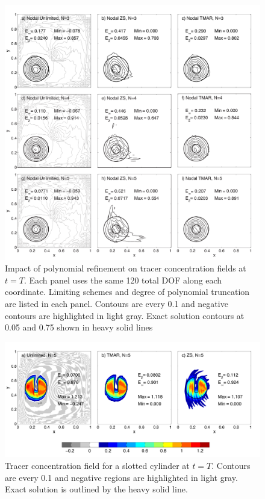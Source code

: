 \documentclass{ametsoc}
\begin{document}
\begin{figure}[t]
\includegraphics[width=\textwidth]{figs/2d/_defCosbell_9pan_pref.pdf}
\caption{Impact of polynomial refinement on tracer concentration fields at $t=T$. Each panel uses the same 120 total DOF along each coordinate. Limiting schemes and degree of polynomial truncation are listed in each panel. Contours are every 0.1 and negative contours are highlighted in light gray. Exact solution contours at 0.05 and 0.75 shown in heavy solid lines}\label{fig:2dCosbellPref}
\end{figure}

\begin{figure}[t]
\includegraphics[width=\textwidth]{figs/2d/defCyl_3panel.pdf}
\caption{Tracer concentration field for a slotted cylinder at $t=T$. Contours are every 0.1 and negative regions are highlighted in light gray. Exact solution is outlined by the heavy solid line.}\label{fig:2dCyl}
\end{figure}
\end{document}
